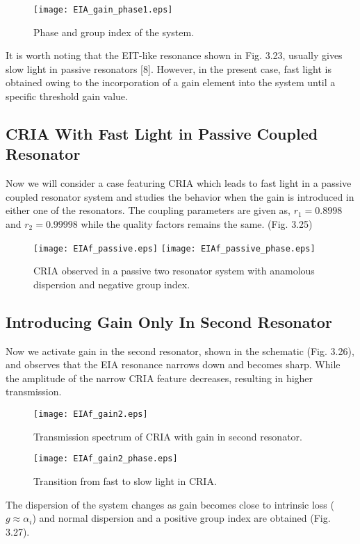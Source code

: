 \begin{figure}[h]
\centering
\texttt{[image: EIA\_gain\_phase1.eps]}
\caption{Phase and group index of the system.}
\end{figure}

It is worth noting that the EIT-like resonance shown in Fig. 3.23, usually gives slow light in passive resonators [8]. However, in the present case, fast light is obtained owing to the incorporation of a gain element into the system until a specific threshold gain value.

\subsection{CRIA With Fast Light in Passive Coupled Resonator}
Now we will consider a case featuring CRIA which leads to fast light in a passive coupled resonator system and studies the behavior when the gain is introduced in either one of the resonators. The coupling parameters are given as, $r_{1} = 0.8998$ and $r_{2} = 0.99998$ while the quality factors remains the same. (Fig. 3.25)

\begin{figure}[h]
\centering
\texttt{[image: EIAf\_passive.eps]}
\texttt{[image: EIAf\_passive\_phase.eps]}
\caption{CRIA observed in a passive two resonator system with anamolous dispersion and negative group index.}
\end{figure}

\subsection{Introducing Gain Only In Second Resonator}
Now we activate gain in the second resonator, shown in the schematic (Fig. 3.26), and observes that the EIA resonance narrows down and becomes sharp. While the amplitude of the narrow CRIA feature decreases, resulting in higher transmission. 

\begin{figure}[h]
\centering 
\texttt{[image: EIAf\_gain2.eps]}
\caption{Transmission spectrum of CRIA with gain in second resonator.}
\end{figure}


\begin{figure}[h]
\centering
\texttt{[image: EIAf\_gain2\_phase.eps]}
\caption{Transition from fast to slow light in CRIA.}
\end{figure}

The dispersion of the system changes as gain becomes close to intrinsic loss ($g \approx \alpha_{i}$) and normal dispersion and a positive group index are obtained (Fig. 3.27).

